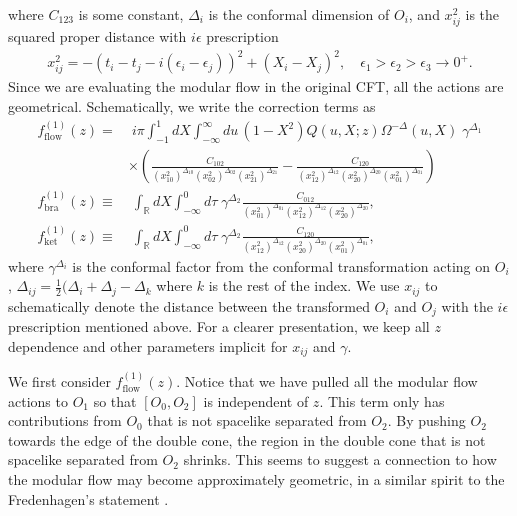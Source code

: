 \documentclass[a4paper,11pt]{article}
\theoremstyle{definition}
\theoremstyle{remark}
\begin{document}
where $C_{123}$ is some constant, $\Delta_i$ is the conformal dimension of $O_i$, and $x_{ij}^2$ is the squared proper distance with $i\epsilon$ prescription
\begin{gather}
    x_{ij}^2 = -(t_i-t_j-i(\epsilon_i-\epsilon_j))^2 + (X_i-X_j)^2, \quad \epsilon_1 > \epsilon_2 > \epsilon_3 \to 0^+.
\end{gather}
Since we are evaluating the modular flow in the original CFT, all the actions are geometrical. Schematically, we write the correction terms as
\begin{align}
    f^{(1)}_{\text{flow}}(z) =&\; i\pi  \int_{-1}^1 dX \int_{-\infty}^{\infty} du \, (1-X^2)Q(u,X;z) \Omega^{-\Delta}(u,X) \;\gamma^{\Delta_1} \nonumber\\
    &\times\left(\frac{C_{102}}{(x_{10}^2)^{\Delta_{10}}(x_{02}^2)^{\Delta_{02}}(x_{21}^2)^{\Delta_{21}}} -\frac{C_{120}}{(x_{12}^2)^{\Delta_{12}}(x_{20}^2)^{\Delta_{20}}(x_{01}^2)^{\Delta_{01}}}\right) \\
    f^{(1)}_{\text{bra}}(z) \equiv&\; \int_\mathbb{R} dX \int_{-\infty}^{0} d\tau \;\gamma^{\Delta_2} \frac{C_{012}}{(x_{01}^2)^{\Delta_{01}}(x_{12}^2)^{\Delta_{12}}(x_{20}^2)^{\Delta_{20}}},\\
    f^{(1)}_{\text{ket}}(z) \equiv&\; \int_\mathbb{R} dX \int_{-\infty}^{0} d\tau \; \gamma^{\Delta_2}\frac{C_{120}}{(x_{12}^2)^{\Delta_{12}}(x_{20}^2)^{\Delta_{20}}(x_{01}^2)^{\Delta_{01}}},
\end{align}
where $\gamma^{\Delta_i}$ is the conformal factor from the conformal transformation acting on $O_i$, $\Delta_{ij} = \frac{1}{2}(\Delta_i+\Delta_j - \Delta_k$ where $k$ is the rest of the index. We use $x_{ij}$ to schematically denote the distance between the transformed $O_i$ and $O_j$ with the $i\epsilon$ prescription mentioned above. For a clearer presentation, we keep all $z$ dependence and other parameters implicit for $x_{ij}$ and $\gamma$. 

We first consider $f^{(1)}_{\text{flow}}(z)$. Notice that we have pulled all the modular flow actions to $O_1$ so that $[O_0,O_2]$ is independent of $z$. This term only has contributions from $O_0$ that is not spacelike separated from $O_2$. By pushing $O_2$ towards the edge of the double cone, the region in the double cone that is not spacelike separated from $O_2$ shrinks. This seems to suggest a connection to how the modular flow may become approximately geometric, in a similar spirit to the Fredenhagen's statement \cite{fredenhagen}. 
\end{document}
